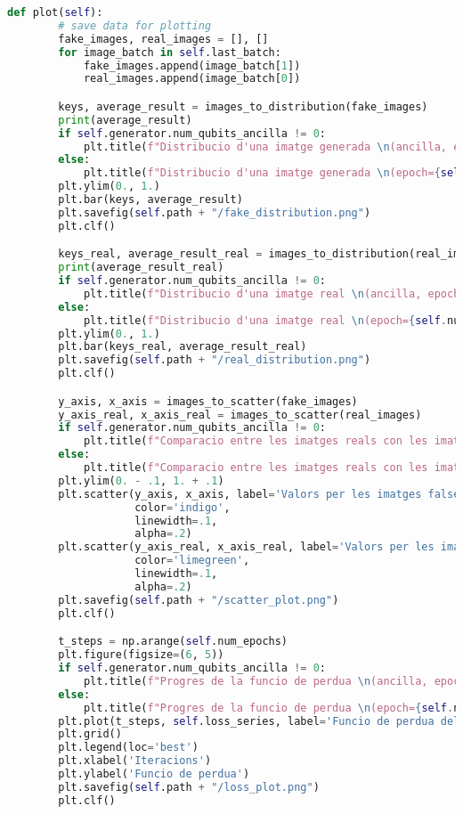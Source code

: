 \begin{lstlisting}[language=Python, caption=Codi per la definició del model]
	def plot(self):
		# save data for plotting
		fake_images, real_images = [], []
		for image_batch in self.last_batch:
			fake_images.append(image_batch[1])
			real_images.append(image_batch[0])

		keys, average_result = images_to_distribution(fake_images)
		print(average_result)
		if self.generator.num_qubits_ancilla != 0:
			plt.title(f"Distribucio d'una imatge generada \n(ancilla, epoch={self.num_epochs})")
		else:
			plt.title(f"Distribucio d'una imatge generada \n(epoch={self.num_epochs})")
		plt.ylim(0., 1.)
		plt.bar(keys, average_result)
		plt.savefig(self.path + "/fake_distribution.png")
		plt.clf()

		keys_real, average_result_real = images_to_distribution(real_images)
		print(average_result_real)
		if self.generator.num_qubits_ancilla != 0:
			plt.title(f"Distribucio d'una imatge real \n(ancilla, epoch={self.num_epochs})")
		else:
			plt.title(f"Distribucio d'una imatge real \n(epoch={self.num_epochs})")
		plt.ylim(0., 1.)
		plt.bar(keys_real, average_result_real)
		plt.savefig(self.path + "/real_distribution.png")
		plt.clf()

		y_axis, x_axis = images_to_scatter(fake_images)
		y_axis_real, x_axis_real = images_to_scatter(real_images)
		if self.generator.num_qubits_ancilla != 0:
			plt.title(f"Comparacio entre les imatges reals con les imatges falses \n(ancilla, epoch={self.num_epochs})")
		else:
			plt.title(f"Comparacio entre les imatges reals con les imatges falses \n(epoch={self.num_epochs})")
		plt.ylim(0. - .1, 1. + .1)
		plt.scatter(y_axis, x_axis, label='Valors per les imatges falses',
				 	color='indigo',
					linewidth=.1,
					alpha=.2)
		plt.scatter(y_axis_real, x_axis_real, label='Valors per les imatges reals',
					color='limegreen',
					linewidth=.1,
					alpha=.2)
		plt.savefig(self.path + "/scatter_plot.png")
		plt.clf()

		t_steps = np.arange(self.num_epochs)
		plt.figure(figsize=(6, 5))
		if self.generator.num_qubits_ancilla != 0:
			plt.title(f"Progres de la funcio de perdua \n(ancilla, epoch={self.num_epochs})")
		else:
			plt.title(f"Progres de la funcio de perdua \n(epoch={self.num_epochs})")
		plt.plot(t_steps, self.loss_series, label='Funcio de perdua del discriminador', color='rebeccapurple', linewidth=2)
		plt.grid()
		plt.legend(loc='best')
		plt.xlabel('Iteracions')
		plt.ylabel('Funcio de perdua')
		plt.savefig(self.path + "/loss_plot.png")
		plt.clf()


\end{lstlisting}
